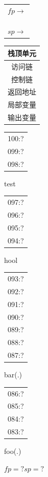 \documentclass[UTF8,zihao=-4]{ctexart}
\begin{document}
\begin{minipage}[t]{0.41\textwidth}
\centering
\begin{tabular}{l}
$fp\to$\\[1.2em]\\[1.2em]\\[1.2em]\\
$sp\to$
\end{tabular}
\begin{tabular}{|c|}
\hline
栈顶单元\\ \hline
访问链\\ \hline
控制链\\ \hline
返回地址\\ \hline
局部变量\\ \hline
输出变量\\ \hline
\end{tabular}
\quad

\vspace{1em}
\begin{tabular}{|c|}
\hline
100:?\\
099:?\\
098:?\\
\hline
\end{tabular}\quad test

\vspace{0.2em}
\begin{tabular}{|c|}
\hline
097:?\\
096:?\\
095:?\\
094:?\\
\hline
\end{tabular}\quad hool

\vspace{0.2em}
\begin{tabular}{|c|}
\hline
093:?\\
092:?\\
091:?\\
090:?\\
089:?\\
088:?\\
087:?\\
\hline
\end{tabular}\quad bar(.)

\vspace{0.2em}
\begin{tabular}{|c|}
\hline
086:?\\
085:?\\
084:?\\
083:?\\
\hline
\end{tabular}\quad foo(.)

\vspace{0.7em}
$fp=?$\hspace{3em}$sp=?$
\end{minipage}
\end{document}

